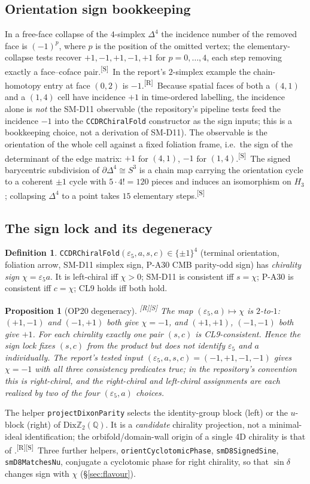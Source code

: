 \documentclass[11pt,a4paper]{article}
\newtheorem{proposition}[theorem]{Proposition}
\theoremstyle{definition}
\newtheorem{definition}[theorem]{Definition}
\theoremstyle{remark}
\newcommand{\DZ}{\mathrm{Dix}\mathbb{Z}_2(\mathbb{Q})}
\newcommand{\code}[1]{\texttt{#1}}
\newcommand{\tR}{\textsuperscript{[R]}}
\newcommand{\tS}{\textsuperscript{[S]}}
\begin{document}
\subsection{Orientation sign bookkeeping}
In a free-face collapse of the $4$-simplex $\Delta^4$ the incidence number of the removed face is $(-1)^{p}$, where $p$ is the position of the omitted vertex; the elementary-collapse tests recover $+1,-1,+1,-1,+1$ for $p=0,\dots,4$, each step removing exactly a face--coface pair.\tS\ In the report's $2$-simplex example the chain-homotopy entry at face $(0,2)$ is $-1$.\tR\ Because spatial faces of both a $(4,1)$ and a $(1,4)$ cell have incidence $+1$ in time-ordered labelling, the incidence alone is \emph{not} the SM-D11 observable (the repository's pipeline tests feed the incidence $-1$ into the \code{CCDRChiralFold} constructor as the sign inputs; this is a bookkeeping choice, not a derivation of SM-D11). The observable is the orientation of the whole cell against a fixed foliation frame, i.e.\ the sign of the determinant of the edge matrix: $+1$ for $(4,1)$, $-1$ for $(1,4)$.\tS\ The signed barycentric subdivision of $\partial\Delta^4\cong S^3$ is a chain map carrying the orientation cycle to a coherent $\pm1$ cycle with $5\cdot4!=120$ pieces and induces an isomorphism on $H_3$; collapsing $\Delta^4$ to a point takes $15$ elementary steps.\tS

\subsection{The sign lock and its degeneracy}
\begin{definition}\label{def:chiralfold}
\code{CCDRChiralFold}$(\varepsilon_5,a,s,c)\in\{\pm1\}^4$ (terminal orientation, foliation arrow, SM-D11 simplex sign, P-A30 CMB parity-odd sign) has \emph{chirality sign} $\chi=\varepsilon_5 a$. It is left-chiral iff $\chi>0$; SM-D11 is consistent iff $s=\chi$; P-A30 is consistent iff $c=\chi$; CL9 holds iff both hold.
\end{definition}
\begin{proposition}[OP20 degeneracy]\label{prop:op20}\tR\tS
The map $(\varepsilon_5,a)\mapsto\chi$ is $2$-to-$1$: $(+1,-1)$ and $(-1,+1)$ both give $\chi=-1$, and $(+1,+1)$, $(-1,-1)$ both give $+1$. For each chirality exactly one pair $(s,c)$ is CL9-consistent. Hence the sign lock fixes $(s,c)$ from the product but does not identify $\varepsilon_5$ and $a$ individually. The report's tested input $(\varepsilon_5,a,s,c)=(-1,+1,-1,-1)$ gives $\chi=-1$ with all three consistency predicates true; in the repository's convention this is \emph{right}-chiral, and the right-chiral and left-chiral assignments are each realized by two of the four $(\varepsilon_5,a)$ choices.
\end{proposition}
\noindent The helper \code{projectDixonParity} selects the identity-group block (left) or the $u$-block (right) of $\DZ$. It is a \emph{candidate} chirality projection, not a minimal-ideal identification; the orbifold/domain-wall origin of a single 4D chirality is that of \cite{Kaplan}.\tR\tS\ Three further helpers, \code{orientCyclotomicPhase}, \code{smD8SignedSine}, \code{smD8MatchesNu}, conjugate a cyclotomic phase for right chirality, so that $\sin\delta$ changes sign with $\chi$ (\S\ref{sec:flavour}).
\end{document}
